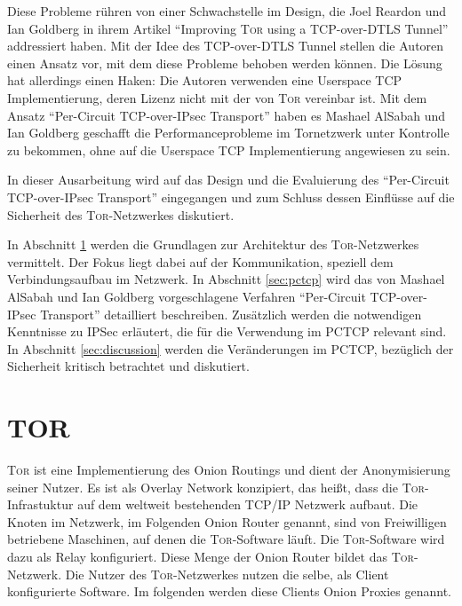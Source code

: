 \documentclass[fleqn,envcountsame,runningheads,10pt,a4paper]{llncs}
\begin{document}
Diese Probleme rühren von einer Schwachstelle im Design, die Joel Reardon und Ian Goldberg in ihrem Artikel ``Improving \textsc{Tor} using a TCP-over-DTLS Tunnel'' addressiert haben. Mit der Idee des TCP-over-DTLS Tunnel stellen die Autoren einen Ansatz vor, mit dem diese Probleme behoben werden können. Die Lösung hat allerdings einen Haken: Die Autoren verwenden eine Userspace TCP Implementierung, deren Lizenz nicht mit der von \textsc{Tor} vereinbar ist. Mit dem Ansatz ``Per-Circuit TCP-over-IPsec Transport'' haben es Mashael AlSabah und Ian Goldberg geschafft die Performanceprobleme im Tornetzwerk unter Kontrolle zu bekommen, ohne auf die Userspace TCP Implementierung angewiesen zu sein.

In dieser Ausarbeitung wird auf das Design und die Evaluierung des ``Per-Circuit TCP-over-IPsec Transport'' eingegangen und zum Schluss dessen Einflüsse auf die Sicherheit des \textsc{Tor}-Netzwerkes diskutiert.

In Abschnitt \ref{sec:tor} werden die Grundlagen zur Architektur des \textsc{Tor}-Netzwerkes vermittelt.
Der Fokus liegt dabei auf der Kommunikation, speziell dem Verbindungsaufbau im Netzwerk. In Abschnitt \ref{sec:pctcp} wird das von Mashael AlSabah und Ian Goldberg vorgeschlagene Verfahren ``Per-Circuit TCP-over-IPsec Transport'' detailliert beschreiben. Zusätzlich werden die notwendigen Kenntnisse zu IPSec erläutert, die für die Verwendung im PCTCP relevant sind. In Abschnitt \ref{sec:discussion} werden die Veränderungen im PCTCP, bezüglich der Sicherheit kritisch betrachtet und diskutiert.

\newpage
\section{TOR}
\label{sec:tor}



\textsc{Tor} ist eine Implementierung des Onion Routings und dient der Anonymisierung seiner Nutzer.
Es ist als Overlay Network konzipiert, das heißt, dass die \textsc{Tor}-Infrastuktur auf dem weltweit bestehenden TCP/IP Netzwerk aufbaut.
Die Knoten im Netzwerk, im Folgenden Onion Router genannt, sind von Freiwilligen betriebene Maschinen, auf denen die \textsc{Tor}-Software läuft. Die \textsc{Tor}-Software wird dazu als Relay konfiguriert.
Diese Menge der Onion Router bildet das \textsc{Tor}-Netzwerk.
Die Nutzer des \textsc{Tor}-Netzwerkes nutzen die selbe, als Client konfigurierte Software.
Im folgenden werden diese Clients Onion Proxies genannt.
\end{document}
